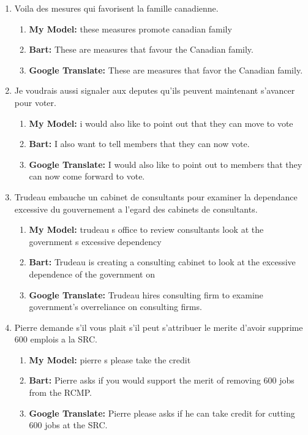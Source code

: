 \documentclass[11pt]{article}
\begin{document}
\begin{enumerate}
  \item Voila des mesures qui favorisent la famille canadienne.
  \begin{enumerate}
    \item \textbf{My Model:} these measures promote canadian family
    \item \textbf{Bart:} These are measures that favour the Canadian family.
    \item \textbf{Google Translate:} These are measures that favor the Canadian family.
  \end{enumerate}
  \item Je voudrais aussi signaler aux deputes qu'ils peuvent maintenant s'avancer pour voter.
  \begin{enumerate}
    \item \textbf{My Model:} i would also like to point out that they can move to vote
    \item \textbf{Bart:} I also want to tell members that they can now vote.
    \item \textbf{Google Translate:} I would also like to point out to members that they can now come forward to vote.
  \end{enumerate}
  \item Trudeau embauche un cabinet de consultants pour examiner la dependance excessive du gouvernement a l'egard des cabinets de consultants.
  \begin{enumerate}
    \item \textbf{My Model:} trudeau s office to review consultants look at the government s excessive dependency
    \item \textbf{Bart:} Trudeau is creating a consulting cabinet to look at the excessive dependence of the government on
    \item \textbf{Google Translate:} Trudeau hires consulting firm to examine government's overreliance on consulting firms.
  \end{enumerate}
  \item Pierre demande s'il vous plait s'il peut s'attribuer le merite d'avoir supprime 600 emplois a la SRC.
  \begin{enumerate}
    \item \textbf{My Model:} pierre s please take the credit
    \item \textbf{Bart:} Pierre asks if you would support the merit of removing 600 jobs from the RCMP.
    \item \textbf{Google Translate:} Pierre please asks if he can take credit for cutting 600 jobs at the SRC.

\end{enumerate}
\end{enumerate}
\end{document}
